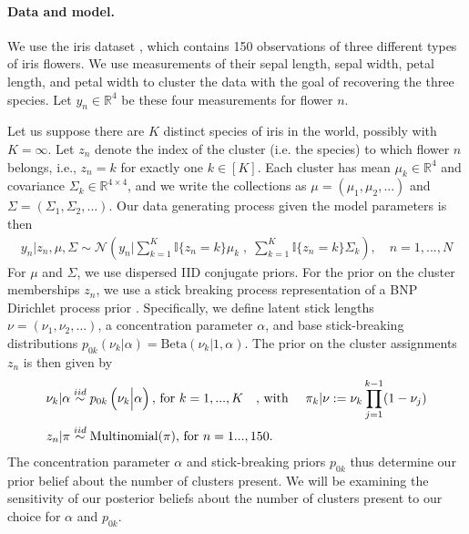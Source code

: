 \paragraph{Data and model.}
We use the iris dataset \citep{iris_data_anderson, iris_data_fisher}, which
contains 150 observations of three different types of iris flowers. We use
measurements of their sepal length, sepal width, petal length, and petal width
to cluster the data with the goal of recovering the three species. Let $y_{n}\in
\mathbb{R}^4$ be these four measurements for flower $n$.

Let us suppose there are $K$ distinct species of iris in the world, possibly
with $K=\infty$. Let $z_n$ denote the index of the cluster (i.e. the species) to
which flower $n$ belongs, i.e., $z_n = k$ for exactly one $k\in [K]$. Each
cluster has mean $\mu_k\in \mathbb{R}^4$ and covariance $\Sigma_k \in
\mathbb{R}^{4\times 4}$, and we write the collections as $\mu = \left(\mu_1,
\mu_2, ...\right)$ and $\Sigma = \left(\Sigma_1, \Sigma_2, ... \right)$. Our
data generating process given the model parameters is then
%
\begin{align*}
	y_n | z_n, \mu, \Sigma \sim
        \mathcal{N}\left(
            y_n \Big\vert
                \sum_{k=1}^K \mathbb{I}\{z_n = k\} \mu_k \;,
              \; \sum_{k=1}^K \mathbb{I}\{z_n = k\} \Sigma_k\right),
	\quad n = 1, ..., N
\end{align*}
%
For $\mu$ and $\Sigma$, we use dispersed IID conjugate priors.
%
%
For the prior on the cluster memberships $z_n$, we use a stick breaking
process representation of a BNP Dirichlet process prior
\citep{ferguson:1973:bayesian, sethuraman:1994:constructivedp}. Specifically, we
define latent stick lengths $\nu=\left(\nu_1, \nu_2, ...\right)$, a
concentration parameter $\alpha$, and base stick-breaking distributions
$p_{0k}\left(\nu_k \vert \alpha \right) = \mathrm{Beta}\left(\nu_k \Big\vert 1,
\alpha \right)$.  The prior on the cluster assignments $z_n$ is then given by
%
\begin{align}
\nu_k \vert \alpha &\stackrel{iid}{\sim}
    p_{0k}\left(\nu_k \Big\vert \alpha\right)\textrm{, for }k=1,...,K
    \quad\textrm{, with }\quad \nonumber
\pi_k | \nu := \nu_k \prod_{j=1}^{k-1} (1 - \nu_j) \label{eq:stick_breaking} \\
z_n \vert \pi &\stackrel{iid}{\sim} \mathrm{Multinomial}(\pi)\textrm{, for }n = 1...,150.
\end{align}
%
The concentration parameter $\alpha$ and stick-breaking priors $p_{0k}$
thus determine our prior belief about the number of clusters present.
We will be examining the sensitivity of our posterior beliefs about the
number of clusters present to our choice for $\alpha$ and $p_{0k}$.
